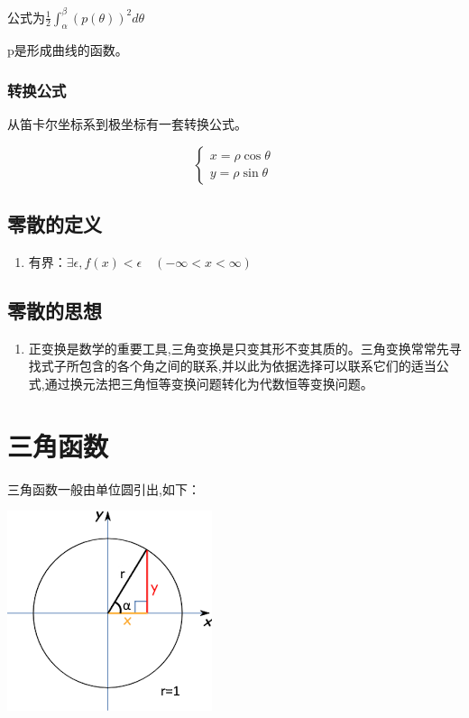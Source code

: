 \documentclass[UTF8]{ctexbook}
\newcommand{\definiteIntegral}[2]{\int^{#1}_{#2}}
\begin{document}
{{{{    公式为$\frac{1}{2}\definiteIntegral{\beta}{\alpha}(p(\theta))^2d\theta$

    p是形成曲线的函数。
    }%

    \subsubsection{转换公式}{
      从笛卡尔坐标系到极坐标有一套转换公式。

      $$
        \begin{cases}
          x = \rho\cos\theta \\
          y = \rho\sin\theta
        \end{cases}
      $$
    }%

  }%

  \subsection{零散的定义}{
    \begin{enumerate}
      \item 有界：$\exists\epsilon,f(x) < \epsilon\quad(-\infty < x < \infty )$
    \end{enumerate}
  }%

  \subsection{零散的思想}{
    \begin{enumerate}
      \item 正变换是数学的重要工具,三角变换是只变其形不变其质的。三角变换常常先寻找式子所包含的各个角之间的联系,并以此为依据选择可以联系它们的适当公式,通过换元法把三角恒等变换问题转化为代数恒等变换问题。
    \end{enumerate}
  }%

}%

\section{三角函数}{
三角函数一般由单位圆引出,如下：

\includegraphics{resources/UnitCircle.png}

}}
\end{document}
